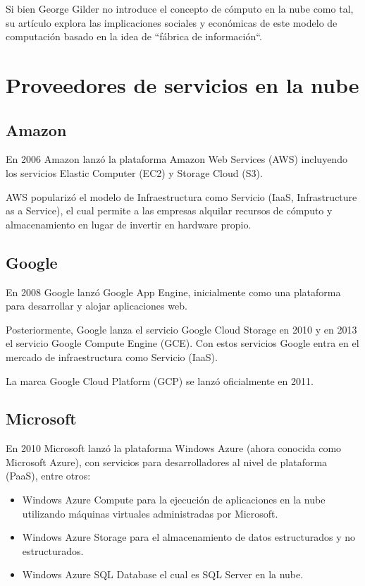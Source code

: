 \documentclass[11pt,a4paper,oneside]{book}
\begin{document}
Si bien George Gilder no introduce el concepto de cómputo en la nube como tal, su artículo explora las implicaciones sociales y económicas de este modelo de computación basado en la idea de ``fábrica de información``.

\section{Proveedores de servicios en la nube}

\subsection{Amazon}

En 2006 Amazon lanzó la plataforma Amazon Web Services (AWS) incluyendo los servicios Elastic Computer (EC2) y Storage Cloud (S3).

AWS popularizó el modelo de Infraestructura como Servicio (IaaS, Infrastructure as a Service), el cual permite a las empresas alquilar recursos de cómputo y almacenamiento en lugar de invertir en hardware propio.

\subsection{Google}

En 2008 Google lanzó Google App Engine, inicialmente como una plataforma para desarrollar y alojar aplicaciones web.

Posteriormente, Google lanza el servicio Google Cloud Storage en 2010 y en 2013 el servicio Google Compute Engine (GCE). Con estos servicios Google entra en el mercado de infraestructura como Servicio (IaaS).

La marca Google Cloud Platform (GCP) se lanzó oficialmente en 2011.

\subsection{Microsoft}

En 2010 Microsoft lanzó la plataforma Windows Azure (ahora conocida como Microsoft Azure), con servicios para desarrolladores al nivel de plataforma (PaaS), entre otros:

\begin{itemize}

\item Windows Azure Compute para la ejecución de aplicaciones en la nube utilizando máquinas virtuales administradas por Microsoft.

\item Windows Azure Storage para el almacenamiento de datos estructurados y no estructurados.

\item Windows Azure SQL Database el cual es SQL Server en la nube.

\end{itemize}
\end{document}

